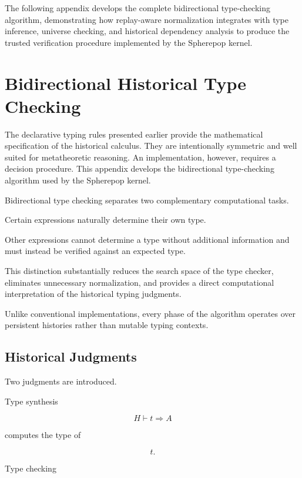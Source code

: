 \documentclass[12pt,oneside]{article}
\theoremstyle{definition}
\theoremstyle{remark}
\begin{document}
The following appendix develops the complete bidirectional type-checking
algorithm, demonstrating how replay-aware normalization integrates with type
inference, universe checking, and historical dependency analysis to produce the
trusted verification procedure implemented by the Spherepop kernel.

\section{Bidirectional Historical Type Checking}

The declarative typing rules presented earlier provide the mathematical
specification of the historical calculus. They are intentionally symmetric and
well suited for metatheoretic reasoning. An implementation, however, requires a
decision procedure. This appendix develops the bidirectional type-checking
algorithm used by the Spherepop kernel.

Bidirectional type checking separates two complementary computational tasks.

Certain expressions naturally determine their own type.

Other expressions cannot determine a type without additional information and
must instead be verified against an expected type.

This distinction substantially reduces the search space of the type checker,
eliminates unnecessary normalization, and provides a direct computational
interpretation of the historical typing judgments.

Unlike conventional implementations, every phase of the algorithm operates over
persistent histories rather than mutable typing contexts.


\subsection{Historical Judgments}

Two judgments are introduced.

Type synthesis

\[
H
\vdash
t
\Rightarrow
A
\]

computes the type of

\[
t.
\]

Type checking
\end{document}
